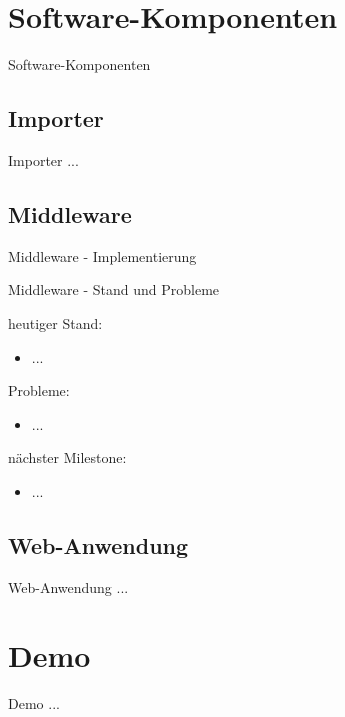 \documentclass[9pt]{beamer}
\begin{document}
\section{Software-Komponenten}

\begin{frame}{Software-Komponenten}{}
	\begin{center}
	\end{center}
\end{frame}

\subsection{Importer}

\begin{frame}{Importer}{}
	...
\end{frame}

\subsection{Middleware}

\begin{frame}{Middleware - Implementierung}{}
	\begin{center}
	\end{center}
\end{frame}

\begin{frame}{Middleware - Stand und Probleme}{}

	heutiger Stand:
	\begin{itemize}
		\item ...
	\end{itemize}

	Probleme:
	\begin{itemize}
		\item ...
	\end{itemize}
	
	nächster Milestone:
	\begin{itemize}
		\item ...
	\end{itemize}

\end{frame}

\subsection{Web-Anwendung}

\begin{frame}{Web-Anwendung}{}
	...
\end{frame}

\section{Demo}

\begin{frame}{Demo}{}
	...
\end{frame}
\end{document}

